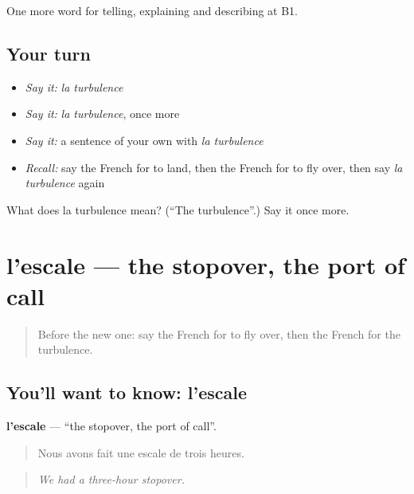\begin{grammarlens}[title={What you've built}]
One more word for telling, explaining and describing at B1.
\end{grammarlens}

\subsection*{Your turn}
\begin{itemize}
\raggedright
  \item \emph{Say it:} \emph{la turbulence}
  \item \emph{Say it:} \emph{la turbulence}, once more
  \item \emph{Say it:} a sentence of your own with \emph{la turbulence}
  \item \emph{Recall:} say the French for to land, then the French for to fly over, then say \emph{la turbulence} again
\end{itemize}

\begin{tcolorbox}[breakable,colback=teal!4,colframe=teal!35!black,title={Before you move on}]
What does la turbulence mean? (\textquotedblleft{}The turbulence\textquotedblright{}.) Say it once more.
\end{tcolorbox}
\section[l'escale]{l'escale — the stopover, the port of call}

\label{lesson:FR-C420-escale}



\begin{quote}
Before the new one: say the French for to fly over, then the French for the turbulence.
\end{quote}

\subsection*{You'll want to know: l'escale}
\textbf{l'escale} — \textquotedblleft{}the stopover, the port of call\textquotedblright{}.

\begin{quote}
Nous avons fait une escale de trois heures.
\end{quote}

\begin{quote}
\emph{We had a three-hour stopover.}
\end{quote}

